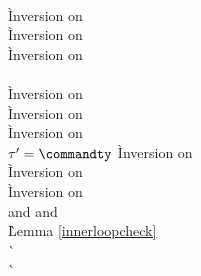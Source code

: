 \begin{description}
\item[] \ \\

  \begin{tabbing}
    \` Inversion on  \\
    \` Inversion on  \\
    \` Inversion on  \\
   \\
    \` Inversion on  \\
    \` Inversion on  \\
    \` Inversion on  \\
  $\tau' = \commandty$
    \` Inversion on  \\
    \` Inversion on  \\
    \` Inversion on  \\
   and  and \\
    \` Lemma \ref{innerloopcheck} \\
    \`  \\
    \`  \\
  \end{tabbing}


\end{description}
